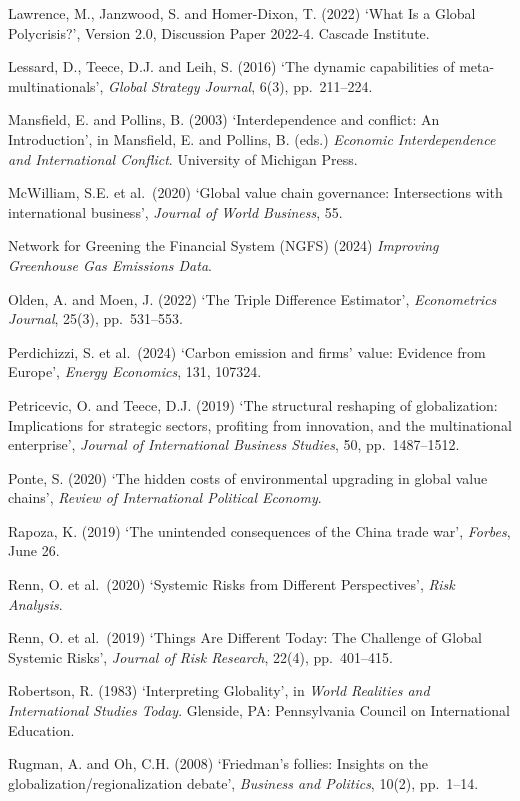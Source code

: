 \documentclass[authoryear,preprint,review,12pt]{elsarticle}
\begin{document}
Lawrence, M., Janzwood, S. and Homer-Dixon, T. (2022) `What Is a Global Polycrisis?', Version 2.0, Discussion Paper 2022-4. Cascade Institute.

Lessard, D., Teece, D.J. and Leih, S. (2016) `The dynamic capabilities of meta-multinationals', \textit{Global Strategy Journal}, 6(3), pp.\ 211--224.

Mansfield, E. and Pollins, B. (2003) `Interdependence and conflict: An Introduction', in Mansfield, E. and Pollins, B. (eds.) \textit{Economic Interdependence and International Conflict}. University of Michigan Press.

McWilliam, S.E. et al.\ (2020) `Global value chain governance: Intersections with international business', \textit{Journal of World Business}, 55.

Network for Greening the Financial System (NGFS) (2024) \textit{Improving Greenhouse Gas Emissions Data}.

Olden, A. and Moen, J. (2022) `The Triple Difference Estimator', \textit{Econometrics Journal}, 25(3), pp.\ 531--553.

Perdichizzi, S. et al.\ (2024) `Carbon emission and firms' value: Evidence from Europe', \textit{Energy Economics}, 131, 107324.

Petricevic, O. and Teece, D.J. (2019) `The structural reshaping of globalization: Implications for strategic sectors, profiting from innovation, and the multinational enterprise', \textit{Journal of International Business Studies}, 50, pp.\ 1487--1512.

Ponte, S. (2020) `The hidden costs of environmental upgrading in global value chains', \textit{Review of International Political Economy}.

Rapoza, K. (2019) `The unintended consequences of the China trade war', \textit{Forbes}, June 26.

Renn, O. et al.\ (2020) `Systemic Risks from Different Perspectives', \textit{Risk Analysis}.

Renn, O. et al.\ (2019) `Things Are Different Today: The Challenge of Global Systemic Risks', \textit{Journal of Risk Research}, 22(4), pp.\ 401--415.

Robertson, R. (1983) `Interpreting Globality', in \textit{World Realities and International Studies Today}. Glenside, PA: Pennsylvania Council on International Education.

Rugman, A. and Oh, C.H. (2008) `Friedman's follies: Insights on the globalization/regionalization debate', \textit{Business and Politics}, 10(2), pp.\ 1--14.
\end{document}
